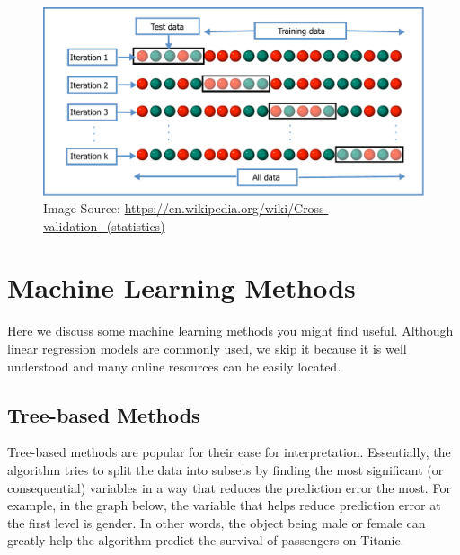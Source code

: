\documentclass[
]{book}
\begin{document}
\begin{figure}
\centering
\includegraphics{images/K-fold_cross_validation_EN.pdf}
\caption{\label{fig:unnamed-chunk-8}Image Source: \url{https://en.wikipedia.org/wiki/Cross-validation_(statistics)}}
\end{figure}

\hypertarget{machine-learning-methods}{%
\chapter{Machine Learning Methods}\label{machine-learning-methods}}

Here we discuss some machine learning methods you might find useful. Although linear regression models are commonly used, we skip it because it is well understood and many online resources can be easily located.

\hypertarget{tree-based-methods}{%
\section{Tree-based Methods}\label{tree-based-methods}}

Tree-based methods are popular for their ease for interpretation. Essentially, the algorithm tries to split the data into subsets by finding the most significant (or consequential) variables in a way that reduces the prediction error the most. For example, in the graph below, the variable that helps reduce prediction error at the first level is gender. In other words, the object being male or female can greatly help the algorithm predict the survival of passengers on Titanic.
\end{document}
